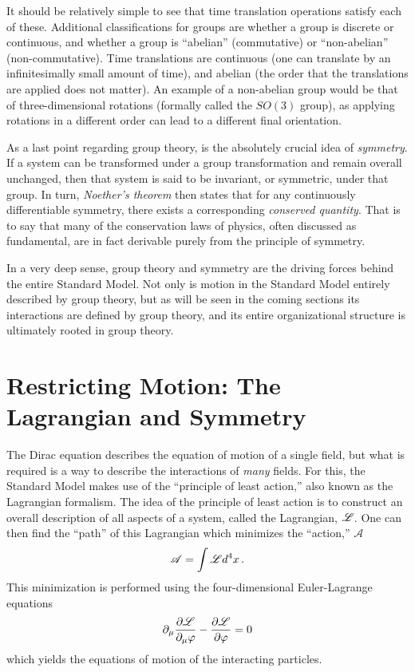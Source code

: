     It should be relatively simple to see that time translation operations satisfy each of these.
    Additional classifications for groups are whether a group is discrete or continuous,
        and whether a group is ``abelian'' (commutative) or ``non-abelian'' (non-commutative).
    Time translations are continuous (one can translate by an infinitesimally small amount of time),
        and abelian (the order that the translations are applied does not matter).
    An example of a non-abelian group would be that of three-dimensional rotations (formally called the $SO(3)$ group),
        as applying rotations in a different order can lead to a different final orientation.

    As a last point regarding group theory, is the absolutely crucial idea of \textit{symmetry}.
    If a system can be transformed under a group transformation and remain overall unchanged,
        then that system is said to be invariant, or symmetric, under that group.
    In turn, \textit{Noether's theorem} then states that for any continuously differentiable symmetry,
        there exists a corresponding \textit{conserved quantity}.
    That is to say that many of the conservation laws of physics, often discussed as fundamental,
        are in fact derivable purely from the principle of symmetry.

    In a very deep sense, group theory and symmetry are the driving forces behind the entire Standard Model.
    Not only is motion in the Standard Model entirely described by group theory,
        but as will be seen in the coming sections its interactions are defined by group theory,
        and its entire organizational structure is ultimately rooted in group theory.


\section{Restricting Motion: The Lagrangian and Symmetry}\label{sec:symmetry}
    
    The Dirac equation describes the equation of motion of a single field,
        but what is required is a way to describe the interactions of \textit{many} fields.
    For this, the Standard Model makes use of the ``principle of least action,''
        also known as the Lagrangian formalism\cite{Halzen_book}.
    The idea of the principle of least action is to construct an overall description of all aspects of a system,
        called the Lagrangian, $\mathscr{L}$.
    One can then find the ``path'' of this Lagrangian which minimizes the ``action,'' $\mathscr{A}$
    \begin{equation}
        \mathscr{A} = \int \mathscr{L} d^4 x
        \,.
    \end{equation}
    This minimization is performed using the four-dimensional Euler-Lagrange equations
    \begin{equation}
        \partial_\mu \frac{\partial \mathscr{L}}{\partial_\mu \varphi } - \frac{\partial \mathscr{L}}{\partial \varphi} = 0
    \end{equation}
    which yields the equations of motion of the interacting particles.

